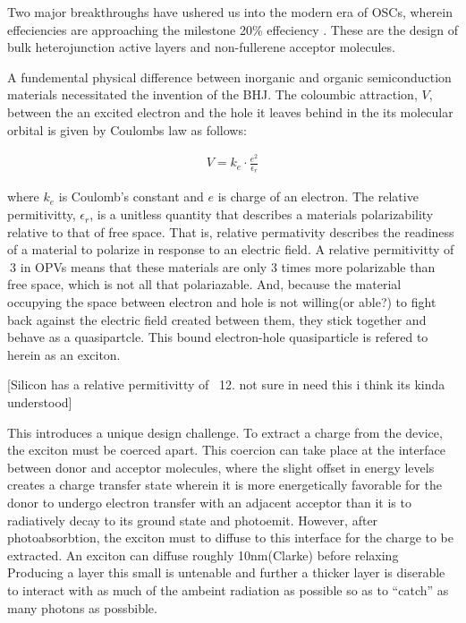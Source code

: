 Two major breakthroughs have ushered us into the modern era of OSCs,
wherein effeciencies are approaching the milestone 20\% effeciency \cite{Liu2020b}.
These are the design of bulk heterojunction active layers and non-fullerene acceptor molecules. 

A fundemental physical difference between inorganic and organic semiconduction materials necessitated the
invention of the BHJ. The coloumbic attraction, $V$, between the an excited
electron and the hole it leaves behind in the its molecular orbital
is given by Coulombs law as follows:

\begin{align}
    V  =  k_{e} \cdot \frac{e^{2}}{\epsilon_{r}}
\end{align}

where $k_{e}$ is Coulomb's constant and $e$ is charge of an electron. The relative permitivitty,
$\epsilon_{r}$, is a unitless quantity that describes a materials polarizability relative
to that of free space. That is, relative
permativity describes the readiness of a material
to polarize in response to an electric field. A
relative permitivitty of $~3$ in OPVs means that these materials are only 3 times more polarizable than free space, which
is not all that polariazable. And, because the material occupying the space between electron and hole
is not willing(or able?) to fight back against the electric field created between them, they stick together and behave as a quasipartcle. 
This bound electron-hole quasiparticle is refered to herein as an exciton.

[Silicon has a relative permitivitty of ~12. not sure in need this i think its kinda understood]

This introduces a unique design challenge.
To extract a charge from the device, the exciton
must be coerced apart. This coercion can take place at the interface between donor and acceptor molecules,
where the slight offset in energy levels creates a charge transfer state wherein it is more
energetically favorable for the donor to undergo electron transfer with an adjacent acceptor than
it is to radiatively decay to its ground state and photoemit.
However, after photoabsorbtion, the exciton must to diffuse to this interface for the charge to be
extracted. An exciton can diffuse roughly 10nm(Clarke) before relaxing \cite{Clarke2010} 
Producing a layer this small is untenable and further a thicker layer
is diserable to interact with as much of the ambeint radiation as possible so as to ``catch'' as many photons
as possbible. 

